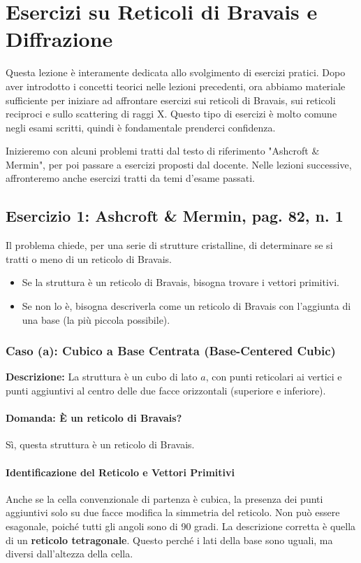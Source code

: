 \section{Esercizi su Reticoli di Bravais e Diffrazione}
\label{sec:lezione5}

Questa lezione è interamente dedicata allo svolgimento di esercizi pratici. Dopo aver introdotto i concetti teorici nelle lezioni precedenti, ora abbiamo materiale sufficiente per iniziare ad affrontare esercizi sui reticoli di Bravais, sui reticoli reciproci e sullo scattering di raggi X. Questo tipo di esercizi è molto comune negli esami scritti, quindi è fondamentale prenderci confidenza.

Inizieremo con alcuni problemi tratti dal testo di riferimento "Ashcroft \& Mermin", per poi passare a esercizi proposti dal docente. Nelle lezioni successive, affronteremo anche esercizi tratti da temi d'esame passati.

\subsection{Esercizio 1: Ashcroft \& Mermin, pag. 82, n. 1}
Il problema chiede, per una serie di strutture cristalline, di determinare se si tratti o meno di un reticolo di Bravais.
\begin{itemize}
    \item Se la struttura è un reticolo di Bravais, bisogna trovare i vettori primitivi.
    \item Se non lo è, bisogna descriverla come un reticolo di Bravais con l'aggiunta di una base (la più piccola possibile).
\end{itemize}

\subsubsection{Caso (a): Cubico a Base Centrata (Base-Centered Cubic)}
\textbf{Descrizione:} La struttura è un cubo di lato $a$, con punti reticolari ai vertici e punti aggiuntivi al centro delle due facce orizzontali (superiore e inferiore).

\paragraph{Domanda: È un reticolo di Bravais?}
Sì, questa struttura è un reticolo di Bravais.

\paragraph{Identificazione del Reticolo e Vettori Primitivi}
Anche se la cella convenzionale di partenza è cubica, la presenza dei punti aggiuntivi solo su due facce modifica la simmetria del reticolo. Non può essere esagonale, poiché tutti gli angoli sono di 90 gradi. La descrizione corretta è quella di un \textbf{reticolo tetragonale}. Questo perché i lati della base sono uguali, ma diversi dall'altezza della cella.

